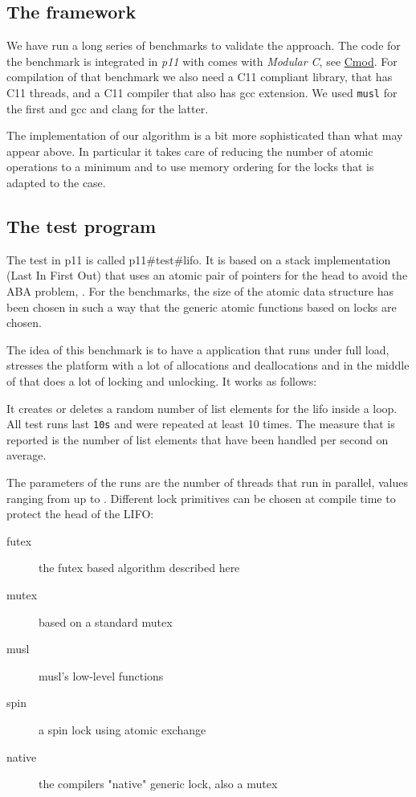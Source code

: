 \subsection{The framework}
\label{sec-4-1}

We have run a long series of benchmarks to validate the
approach. The code for the benchmark is integrated in \emph{p11} with
comes with \emph{Modular C}, see
\href{http://cmod.gforge.inria.fr}{Cmod}. For compilation of that
benchmark we also need a C11 compliant library, that has C11
threads, and a C11 compiler that also has gcc extension. We used
\texttt{musl} for the first and gcc and clang for the latter.

The implementation of our algorithm is a bit more sophisticated
than what may appear above. In particular it takes care of reducing
the number of atomic operations to a minimum and to use memory
ordering for the locks that is adapted to the case.

\subsection{The test program}
\label{sec-4-2}

The test in p11 is called p11\#test\#lifo. It is based on a stack
implementation (Last In First Out) that uses an atomic pair of
pointers for the head to avoid the ABA problem,
\cite{IBM370,michael04:aba}. For the benchmarks, the size of the atomic
data structure has been chosen in such a way that the generic
atomic functions based on locks are chosen.

The idea of this benchmark is to have a application that runs under
full load, stresses the platform with a lot of allocations and
deallocations and in the middle of that does a lot of locking and
unlocking. It works as follows:

It creates or deletes a random number of list elements for the lifo
inside a loop. All test runs last \texttt{10s} and were repeated at least
10 times. The measure that is reported is the number of list
elements that have been handled per second on average.

The parameters of the runs are the number of threads that run in
parallel, values ranging from  up to .  Different lock
primitives can be chosen at compile time to protect the head of the
LIFO:\itemadjust

\begin{description}
\item[{futex}] the futex based algorithm described here
\item[{mutex}] based on a standard mutex
\item[{musl}] musl's low-level  functions
\item[{spin}] a spin lock using atomic exchange
\item[{native}] the compilers "native" generic lock, also a mutex
\end{description}

